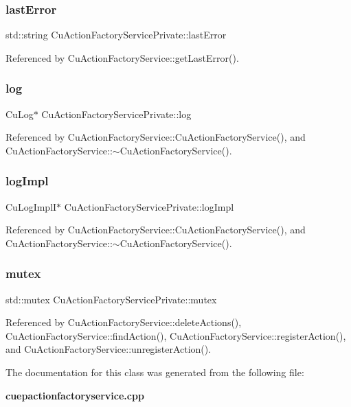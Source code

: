 \subsubsection{last\+Error}
{\footnotesize\ttfamily std\+::string Cu\+Action\+Factory\+Service\+Private\+::last\+Error}



Referenced by Cu\+Action\+Factory\+Service\+::get\+Last\+Error().

\mbox{\label{classCuActionFactoryServicePrivate_a4091f273cc929ea6d1d1593fc8e71801}} 
\subsubsection{log}
{\footnotesize\ttfamily Cu\+Log$\ast$ Cu\+Action\+Factory\+Service\+Private\+::log}



Referenced by Cu\+Action\+Factory\+Service\+::\+Cu\+Action\+Factory\+Service(), and Cu\+Action\+Factory\+Service\+::$\sim$\+Cu\+Action\+Factory\+Service().

\mbox{\label{classCuActionFactoryServicePrivate_aa9d42615edd8d492e5e19fa1a92076a3}} 
\subsubsection{log\+Impl}
{\footnotesize\ttfamily Cu\+Log\+ImplI$\ast$ Cu\+Action\+Factory\+Service\+Private\+::log\+Impl}



Referenced by Cu\+Action\+Factory\+Service\+::\+Cu\+Action\+Factory\+Service(), and Cu\+Action\+Factory\+Service\+::$\sim$\+Cu\+Action\+Factory\+Service().

\mbox{\label{classCuActionFactoryServicePrivate_a6035d66853a23e784840834ad06954d3}} 
\subsubsection{mutex}
{\footnotesize\ttfamily std\+::mutex Cu\+Action\+Factory\+Service\+Private\+::mutex}



Referenced by Cu\+Action\+Factory\+Service\+::delete\+Actions(), Cu\+Action\+Factory\+Service\+::find\+Action(), Cu\+Action\+Factory\+Service\+::register\+Action(), and Cu\+Action\+Factory\+Service\+::unregister\+Action().



The documentation for this class was generated from the following file\+:\begin{DoxyCompactItemize}
\item 
\textbf{ cuepactionfactoryservice.\+cpp}\end{DoxyCompactItemize}
